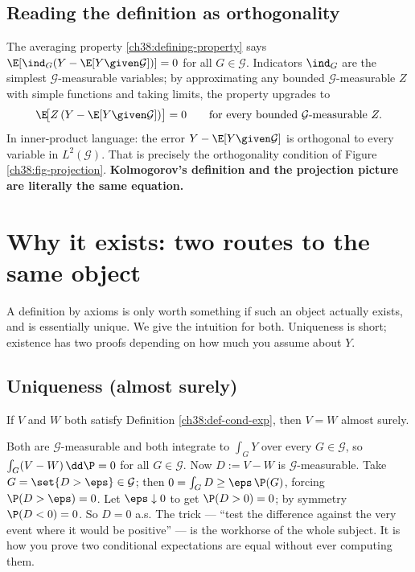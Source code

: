 \subsection{Reading the definition as orthogonality}
\label{ch38:read-as-orthogonality}

The averaging property \eqref{ch38:defining-property} says $\E[\ind_G (Y - \E[Y\given\mathcal{G}])] =
0$ for all $G \in \mathcal{G}$. Indicators $\ind_G$ are the simplest $\mathcal{G}$-measurable
variables; by approximating any bounded $\mathcal{G}$-measurable $Z$ with simple functions and taking
limits, the property upgrades to
\begin{equation}
\label{ch38:orthogonality}
  \E\!\big[Z\,(Y - \E[Y \given \mathcal{G}])\big] = 0 \qquad \text{for every bounded }
  \mathcal{G}\text{-measurable } Z.
\end{equation}
In inner-product language: the error $Y - \E[Y\given\mathcal{G}]$ is orthogonal to every variable in
$L^2(\mathcal{G})$. That is precisely the orthogonality condition of Figure
\ref{ch38:fig-projection}. \textbf{Kolmogorov's definition and the projection picture are literally
the same equation.}

\section{Why it exists: two routes to the same object}
\label{ch38:existence}

A definition by axioms is only worth something if such an object actually exists, and is essentially
unique. We give the intuition for both. Uniqueness is short; existence has two proofs depending on
how much you assume about $Y$.

\subsection{Uniqueness (almost surely)}
\label{ch38:uniqueness}

\begin{proposition}[Uniqueness]
\label{ch38:prop-uniqueness}
If $V$ and $W$ both satisfy Definition \ref{ch38:def-cond-exp}, then $V = W$ almost surely.
\end{proposition}

\begin{whybox}
Both are $\mathcal{G}$-measurable and both integrate to $\int_G Y$ over every $G \in \mathcal{G}$, so
$\int_G (V - W)\,\dd\P = 0$ for all $G \in \mathcal{G}$. Now $D := V - W$ is $\mathcal{G}$-measurable.
Take $G = \set{D > \eps} \in \mathcal{G}$; then $0 = \int_G D \ge \eps\,\P(G)$, forcing
$\P(D > \eps) = 0$. Let $\eps \downarrow 0$ to get $\P(D > 0) = 0$; by symmetry $\P(D < 0) = 0$. So
$D = 0$ a.s. The trick --- ``test the difference against the very event where it would be positive''
--- is the workhorse of the whole subject. It is how you prove two conditional expectations are equal
without ever computing them.
\end{whybox}

